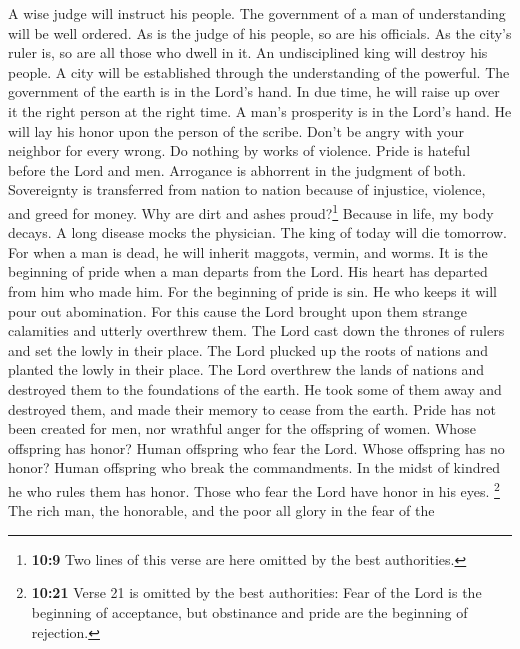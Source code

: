  A wise judge will instruct his people. The government of
a man of understanding will be well ordered.  As is the
judge of his people, so are his officials. As the city's ruler is, so
are all those who dwell in it.  An undisciplined king will
destroy his people. A city will be established through the understanding
of the powerful.  The government of the earth is in the
Lord's hand. In due time, he will raise up over it the right person at
the right time.  A man's prosperity is in the Lord's hand.
He will lay his honor upon the person of the scribe. 
Don't be angry with your neighbor for every wrong. Do nothing by works
of violence.  Pride is hateful before the Lord and men.
Arrogance is abhorrent in the judgment of both. 
Sovereignty is transferred from nation to nation because of injustice,
violence, and greed for money.  Why are dirt and ashes
proud?\footnote{\textbf{10:9} Two lines of this verse are here omitted
  by the best authorities.} Because in life, my body decays.
 A long disease mocks the physician. The king of today
will die tomorrow.  For when a man is dead, he will
inherit maggots, vermin, and worms.  It is the beginning
of pride when a man departs from the Lord. His heart has departed from
him who made him.  For the beginning of pride is sin. He
who keeps it will pour out abomination. For this cause the Lord brought
upon them strange calamities and utterly overthrew them. 
The Lord cast down the thrones of rulers and set the lowly in their
place.  The Lord plucked up the roots of nations and
planted the lowly in their place.  The Lord overthrew the
lands of nations and destroyed them to the foundations of the earth.
 He took some of them away and destroyed them, and made
their memory to cease from the earth.  Pride has not been
created for men, nor wrathful anger for the offspring of women.
 Whose offspring has honor? Human offspring who fear the
Lord. Whose offspring has no honor? Human offspring who break the
commandments.  In the midst of kindred he who rules them
has honor. Those who fear the Lord have honor in his eyes.
 \footnote{\textbf{10:21} Verse 21 is omitted by the best
  authorities: Fear of the Lord is the beginning of acceptance, but
  obstinance and pride are the beginning of rejection.} 
The rich man, the honorable, and the poor all glory in the fear of the
